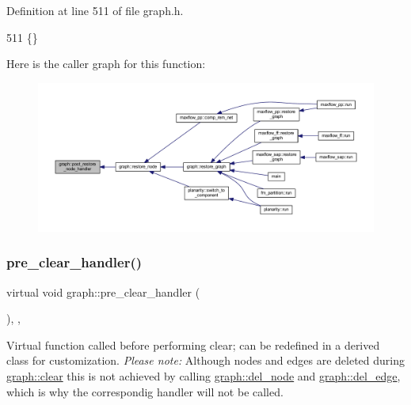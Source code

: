 Definition at line 511 of file graph.\+h.


\begin{DoxyCode}
511 \{\}
\end{DoxyCode}
Here is the caller graph for this function\+:
\nopagebreak
\begin{figure}[H]
\begin{center}
\leavevmode
\includegraphics[width=350pt]{classgraph_a2d555506de6aa30bb981f0b60375762d_icgraph}
\end{center}
\end{figure}
\mbox{\label{classgraph_a16ccad78837d16be59854549cd2d847a}} 
\subsubsection{\texorpdfstring{pre\+\_\+clear\+\_\+handler()}{pre\_clear\_handler()}}
{\footnotesize\ttfamily virtual void graph\+::pre\+\_\+clear\+\_\+handler (\begin{DoxyParamCaption}{ }\end{DoxyParamCaption})\hspace{0.3cm}{\ttfamily [inline]}, {\ttfamily [virtual]}, {\ttfamily [inherited]}}

Virtual function called before performing clear; can be redefined in a derived class for customization. {\itshape Please note\+:} Although nodes and edges are deleted during \mbox{\hyperlink{classgraph_a9ff5d6af3653e79f87b836701453f55a}{graph\+::clear}} this is not achieved by calling \mbox{\hyperlink{classgraph_a8bdc09d5b9ac4bd26586b054d8fcbe91}{graph\+::del\+\_\+node}} and \mbox{\hyperlink{classgraph_ad9356508c49c542dfd4b7169297387c6}{graph\+::del\+\_\+edge}}, which is why the correspondig handler will not be called.

